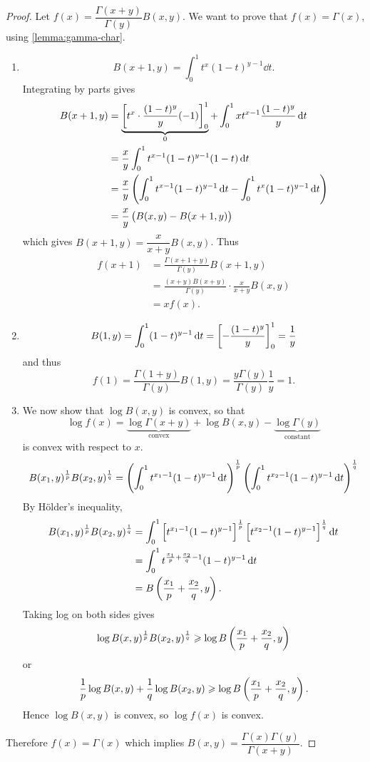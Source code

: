 \begin{proof}
Let $f(x)=\dfrac{\Gamma(x+y)}{\Gamma(y)}B(x,y)$. We want to prove that $f(x)=\Gamma(x)$, using \cref{lemma:gamma-char}.
\begin{enumerate}[label=(\arabic*)]
\item \[B(x+1,y)=\int_0^1 t^x(1-t)^{y-1}\dd{t}.\]
Integrating by parts gives
\begin{align*}
B(x+1,y)&=\underbrace{\left[t^x\cdot\frac{(1-t)^y}{y}(-1)\right]_0^1}_{0}+\int_0^1 xt^{x-1}\frac{(1-t)^y}{y}\dd{t}\\
&=\frac{x}{y}\int_0^1 t^{x-1}(1-t)^{y-1}(1-t)\dd{t}\\
&=\frac{x}{y}\left(\int_0^1 t^{x-1}(1-t)^{y-1}\dd{t}-\int_0^1 t^x(1-t)^{y-1}\dd{t}\right)\\
&=\frac{x}{y}\left(B(x,y)-B(x+1,y)\right)
\end{align*}
which gives $B(x+1,y)=\dfrac{x}{x+y}B(x,y)$. Thus
\begin{align*}
f(x+1)&=\frac{\Gamma(x+1+y)}{\Gamma(y)}B(x+1,y)\\
&=\frac{(x+y)B(x+y)}{\Gamma(y)}\cdot\frac{x}{x+y}B(x,y)\\
&=xf(x).
\end{align*}
\item \[B(1,y)=\int_0^1(1-t)^{y-1}\dd{t}=\left[-\frac{(1-t)^y}{y}\right]_0^1=\frac{1}{y}\]
and thus
\[f(1)=\frac{\Gamma(1+y)}{\Gamma(y)}B(1,y)=\frac{y\Gamma(y)}{\Gamma(y)}\frac{1}{y}=1.\]
\item We now show that $\log B(x,y)$ is convex, so that
\[\log f(x)=\underbrace{\log\Gamma(x+y)}_\text{convex}+\log B(x,y)-\underbrace{\log\Gamma(y)}_\text{constant}\]
is convex with respect to $x$.
\[B(x_1,y)^\frac{1}{p}B(x_2,y)^\frac{1}{q}=\left(\int_0^1 t^{x_1-1}(1-t)^{y-1}\dd{t}\right)^\frac{1}{p}\left(\int_0^1 t^{x_2-1}(1-t)^{y-1}\dd{t}\right)^\frac{1}{q}\]
By H\"{o}lder's inequality,
\begin{align*}
B(x_1,y)^\frac{1}{p}B(x_2,y)^\frac{1}{q}
&=\int_0^1\left[t^{x_1-1}(1-t)^{y-1}\right]^\frac{1}{p}\left[t^{x_2-1}(1-t)^{y-1}\right]^\frac{1}{q}\dd{t}\\
&=\int_0^1 t^{\frac{x_1}{p}+\frac{x_2}{q}-1}(1-t)^{y-1}\dd{t}\\
&=B\left(\frac{x_1}{p}+\frac{x_2}{q},y\right).
\end{align*}
Taking log on both sides gives
\[\log B(x,y)^\frac{1}{p}B(x_2,y)^\frac{1}{q}\geqslant\log B\left(\frac{x_1}{p}+\frac{x_2}{q},y\right)\]
or
\[\frac{1}{p}\log B(x,y)+\frac{1}{q}\log B(x_2,y)\geqslant\log B\left(\frac{x_1}{p}+\frac{x_2}{q},y\right).\]
Hence $\log B(x,y)$ is convex, so $\log f(x)$ is convex.
\end{enumerate}
Therefore $f(x)=\Gamma(x)$ which implies $B(x,y)=\dfrac{\Gamma(x)\Gamma(y)}{\Gamma(x+y)}$.
\end{proof}

